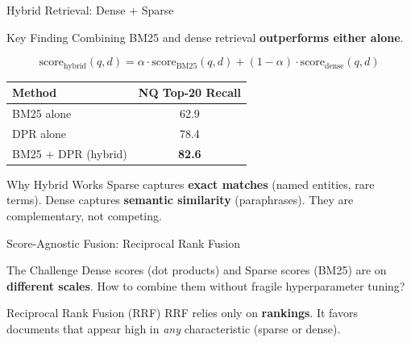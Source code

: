\documentclass[aspectratio=169]{beamer}
\newif\ifanimated
\newcommand{\cpause}{\ifanimated\pause\fi}
\begin{document}
\begin{frame}[shrink=10]{Hybrid Retrieval: Dense + Sparse}
\begin{block}{Key Finding}
Combining BM25 and dense retrieval \textbf{outperforms either alone}.
\end{block}

\vspace{0.5em}

$$\text{score}_{\text{hybrid}}(q, d) = \alpha \cdot \text{score}_{\text{BM25}}(q,d) + (1-\alpha) \cdot \text{score}_{\text{dense}}(q,d)$$

\vspace{0.5em}

\begin{center}
\begin{tabular}{lc}
\toprule
\textbf{Method} & \textbf{NQ Top-20 Recall} \\
\midrule
BM25 alone & 62.9 \\
DPR alone & 78.4 \\
BM25 + DPR (hybrid) & \textbf{82.6} \\
\bottomrule
\end{tabular}
\end{center}

\cpause
\vspace{0.5em}

\begin{exampleblock}{Why Hybrid Works}
Sparse captures \textbf{exact matches} (named entities, rare terms). Dense captures \textbf{semantic similarity} (paraphrases). They are complementary, not competing.
\end{exampleblock}
\end{frame}

\begin{frame}{Score-Agnostic Fusion: Reciprocal Rank Fusion}
\begin{block}{The Challenge}
Dense scores (dot products) and Sparse scores (BM25) are on \textbf{different scales}. How to combine them without fragile hyperparameter tuning?
\end{block}

\vspace{0.5em}

\begin{center}

\end{center}

\vspace{0.5em}
\cpause

\begin{alertblock}{Reciprocal Rank Fusion (RRF)}
RRF relies only on \textbf{rankings}. It favors documents that appear high in \textit{any} characteristic (sparse or dense).
\end{alertblock}
\end{frame}
\end{document}
